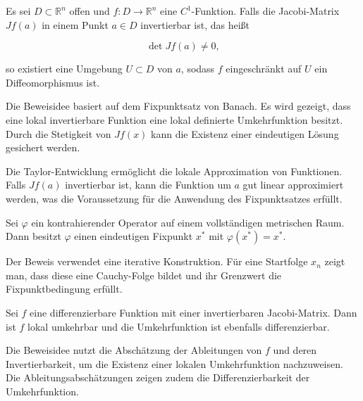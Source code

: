 \begin{satz}{}
Es sei \( D \subset \mathbb{R}^n \) offen und \( f: D \to \mathbb{R}^n \) eine \( C^1 \)-Funktion. Falls die Jacobi-Matrix \( Jf(a) \) in einem Punkt \( a \in D \) invertierbar ist, das heißt


\[
\det Jf(a) \neq 0,
\]


so existiert eine Umgebung \( U \subset D \) von \( a \), sodass \( f \) eingeschränkt auf \( U \) ein Diffeomorphismus ist.
\end{satz}

\begin{beweisbox}
Die Beweisidee basiert auf dem Fixpunktsatz von Banach. Es wird gezeigt, dass eine lokal invertierbare Funktion eine lokal definierte Umkehrfunktion besitzt. Durch die Stetigkeit von \( Jf(x) \) kann die Existenz einer eindeutigen Lösung gesichert werden.
\end{beweisbox}

\begin{motivationbox}
Die Taylor-Entwicklung ermöglicht die lokale Approximation von Funktionen. Falls \( Jf(a) \) invertierbar ist, kann die Funktion um \( a \) gut linear approximiert werden, was die Voraussetzung für die Anwendung des Fixpunktsatzes erfüllt.
\end{motivationbox}

\begin{satz}{}
Sei \( \varphi \) ein kontrahierender Operator auf einem vollständigen metrischen Raum. Dann besitzt \( \varphi \) einen eindeutigen Fixpunkt \( x^* \) mit \( \varphi(x^*) = x^* \).
\end{satz}

\begin{beweisbox}
Der Beweis verwendet eine iterative Konstruktion. Für eine Startfolge \( x_n \) zeigt man, dass diese eine Cauchy-Folge bildet und ihr Grenzwert die Fixpunktbedingung erfüllt.
\end{beweisbox}

\begin{satz}{}
Sei \( f \) eine differenzierbare Funktion mit einer invertierbaren Jacobi-Matrix. Dann ist \( f \) lokal umkehrbar und die Umkehrfunktion ist ebenfalls differenzierbar.
\end{satz}

\begin{beweisbox}
Die Beweisidee nutzt die Abschätzung der Ableitungen von \( f \) und deren Invertierbarkeit, um die Existenz einer lokalen Umkehrfunktion nachzuweisen. Die Ableitungsabschätzungen zeigen zudem die Differenzierbarkeit der Umkehrfunktion.
\end{beweisbox}
